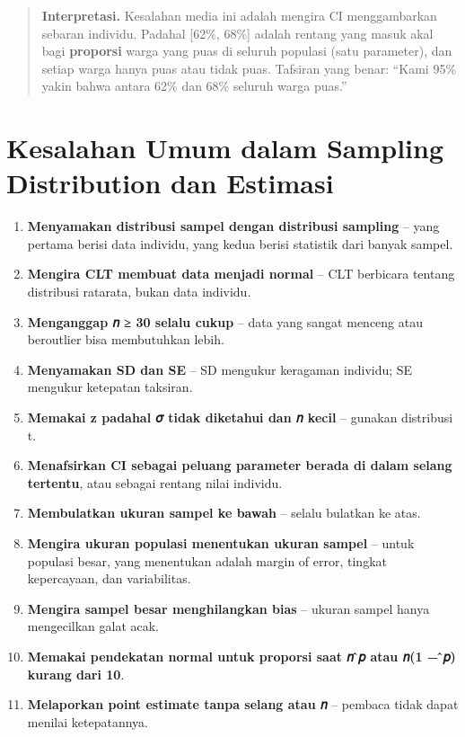 \documentclass[
  indonesian,
  letterpaper,
]{book}
\providecommand{\tightlist}{%
  \setlength{\itemsep}{0pt}\setlength{\parskip}{0pt}}
\begin{document}
\begin{quote}
\textbf{Interpretasi.} Kesalahan media ini adalah mengira CI
menggambarkan sebaran individu. Padahal {[}62\%, 68\%{]} adalah rentang
yang masuk akal bagi \textbf{proporsi} warga yang puas di seluruh
populasi (satu parameter), dan setiap warga hanya puas atau tidak puas.
Tafsiran yang benar: ``Kami 95\% yakin bahwa antara 62\% dan 68\%
seluruh warga puas.''
\end{quote}

\section{Kesalahan Umum dalam Sampling Distribution dan
Estimasi}\label{kesalahan-umum-dalam-sampling-distribution-dan-estimasi}

\begin{enumerate}
\def\labelenumi{\arabic{enumi}.}
\tightlist
\item
  \textbf{Menyamakan distribusi sampel dengan distribusi sampling} --
  yang pertama berisi data individu, yang kedua berisi statistik dari
  banyak sampel.
\item
  \textbf{Mengira CLT membuat data menjadi normal} -- CLT berbicara
  tentang distribusi ratarata, bukan data individu.
\item
  \textbf{Menganggap 𝑛 ≥ 30 selalu cukup} -- data yang sangat menceng
  atau beroutlier bisa membutuhkan lebih.
\item
  \textbf{Menyamakan SD dan SE} -- SD mengukur keragaman individu; SE
  mengukur ketepatan taksiran.
\item
  \textbf{Memakai z padahal 𝜎 tidak diketahui dan 𝑛 kecil} -- gunakan
  distribusi t.
\item
  \textbf{Menafsirkan CI sebagai peluang parameter berada di dalam
  selang tertentu}, atau sebagai rentang nilai individu.
\item
  \textbf{Membulatkan ukuran sampel ke bawah} -- selalu bulatkan ke
  atas.
\item
  \textbf{Mengira ukuran populasi menentukan ukuran sampel} -- untuk
  populasi besar, yang menentukan adalah margin of error, tingkat
  kepercayaan, dan variabilitas.
\item
  \textbf{Mengira sampel besar menghilangkan bias} -- ukuran sampel
  hanya mengecilkan galat acak.
\item
  \textbf{Memakai pendekatan normal untuk proporsi saat 𝑛 ̂𝑝 atau 𝑛(1 −
  ̂𝑝) kurang dari 10}.
\item
  \textbf{Melaporkan point estimate tanpa selang atau 𝑛} -- pembaca
  tidak dapat menilai ketepatannya.
\end{enumerate}
\end{document}

